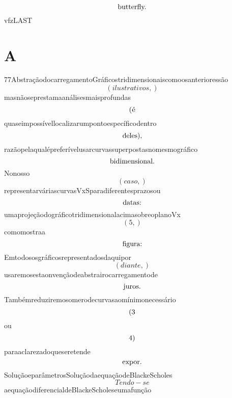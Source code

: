 \documentclass{article}
\begin{document}
\begin{equation}
$butterfly.$
\end{equation}vfzLAST\section{A}77AbstraçãodocarregamentoGráficostridimensionaiscomoosanterioressão\begin{equation}
\left( ilustrativos,\right)
\end{equation}masnãoseprestamaanálisesmaisprofundas\begin{equation}
$(é$
\end{equation}quaseimpossívellocalizarumpontoespecíficodentro\begin{equation}
$deles),$
\end{equation}razãopelaqualépreferívelusarcurvassuperpostasnomesmográfico\begin{equation}
$bidimensional.$
\end{equation}Nonosso\begin{equation}
\left( caso,\right)
\end{equation}representarváriascurvasVxSparadiferentesprazosou\begin{equation}
$datas:$
\end{equation}umaprojeçãodográficotridimensionalacimasobreoplanoVx\begin{equation}
\left( 5,\right)
\end{equation}comomostraa\begin{equation}
$figura:$
\end{equation}Emtodososgráficosrepresentadosdaquipor\begin{equation}
\left( diante,\right)
\end{equation}usaremosestaonvençãodeabstrairocarregamentode\begin{equation}
$juros.$
\end{equation}Tambémreduziremosomerodecurvasaomínimonecessário\begin{equation}
$(3$
\end{equation}ou\begin{equation}
$4)$
\end{equation}paraaclarezadoqueseretende\begin{equation}
$expor.$
\end{equation}SoluçãoeparâmetrosSoluçãodaequaçãodeBlackeScholes\begin{equation}
Tendo - se
\end{equation}aequaçãodiferencialdeBlackeScholeseumafunção\begin{equation}

\end{equation}
\end{document}
